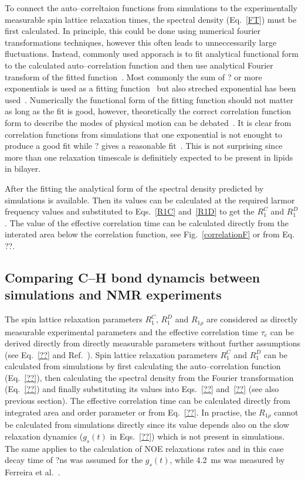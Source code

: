 \documentclass[aps,prl,superscriptaddress,twocolumn]{revtex4}
\begin{document}
To connect the auto--correltaion functions from simulations to the experimentally measurable spin lattice relaxation times, the spectral density (Eq.~\ref{FT})
must be first calculated. In principle, this could be done using numerical fourier transformations techniques, 
however this often leads to unneccessarily large fluctuations. Instead, commonly used apporach is to fit 
analytical functional form to the calculated auto--correlation function and then use analytical Fourier
transform of the fitted function~\cite{??}. Most commonly the sum of ? or more exponentials is used as a fitting function~\cite{??} but
also streched exponential has been used~\cite{??}. Numerically the functional form of the fitting function should not matter as
long as the fit is good, however, theoretically the correct correlation function form to describe the modes of
physical motion can be debated~\cite{??}. It is clear from correlation functions from simulations that one exponential 
is not enought to produce a good fit while ? gives a reasonable fit~\cite{??}. This is not surprising since more
than one relaxation timescale is definitiely expected to be present in lipids in bilayer.

After the fitting the analytical form of the spectral density predicted by simulations is available.
Then its values can be calculated at the required larmor frequency values and substituted to Eqs.~\ref{R1C}
and~\ref{R1D} to get the $R_{1}^{C}$ and $R_{1}^{D}$. The value of the effective correlation time can be
calculated directly from the interated area below the correlation function, see Fig.~\ref{correlationF} or from 
Eq. ??.




\subsection{Comparing C--H bond dynamcis between simulations and NMR experiments}

The spin lattice relaxation parameters $R_1^{C}$, $R_1^{D}$ and $R_{1\rho}$ are considered as
directly measurable experimental parameters and the effective correlation time $\tau_e$ can be derived directly
from directly measurable parameters without further assumptions (see Eq.~\ref{??} and Ref.~\cite{ferreira15}).
Spin lattice relaxation parameters $R_1^{C}$ and $R_1^{D}$ can be calculated from simulations
by first calculating the auto--correlation function (Eq.~\ref{??}), then calculating the spectral
density from the Fourier transformation (Eq.~\ref{??}) and finally substituting its values into
Eqs.~\ref{??} and~\ref{??} (see also previous section). The effective correlation time can be calculated
directly from integrated area and order parameter or from Eq.~\ref{??}.
In practise, the $R_{1\rho}$ cannot be calculated from simulations directly since its value depends
also on the slow relaxation dynamics ($g_s(t)$ in Eqs.~\ref{??}) which is not present in simulations.
The same applies to the calculation of NOE relaxations rates and in this case decay time of ?ns was assumed for the
$g_s(t)$, while 4.2~ms was measured by Ferreira et al.~\cite{ferreira15}.
\end{document}
